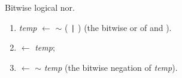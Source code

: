


Bitwise logical {\sc nor}.

\begin{enumerate}

\item {\em temp} $\leftarrow$ $\sim$ (  \verb$|$  )
		(the bitwise {\sc or} of  and ).

\item {} $\leftarrow$ {\em temp};

\item {}   $\leftarrow$ $\sim$ {\em temp}
		(the bitwise negation of {\em temp}).

\end{enumerate}


